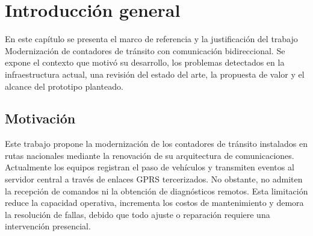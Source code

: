 
\chapter{Introducción general} %

\label{Chapter1} %
\label{IntroGeneral}


\newcommand{\keyword}[1]{\textbf{#1}}
\newcommand{\tabhead}[1]{\textbf{#1}}
\newcommand{\code}[1]{\texttt{#1}}
\newcommand{\file}[1]{\texttt{\bfseries#1}}
\newcommand{\option}[1]{\texttt{\itshape#1}}
\newcommand{\grados}{$^{\circ}$}

En este capítulo se presenta el marco de referencia y la justificación del trabajo Modernización de contadores de tránsito con comunicación bidireccional. Se expone el contexto que motivó su desarrollo, los problemas detectados en la infraestructura actual, una revisión del estado del arte, la propuesta de valor y el alcance del prototipo planteado.





\section{Motivación}

Este trabajo propone la modernización de los contadores de tránsito instalados en rutas nacionales mediante la renovación de su arquitectura de comunicaciones. Actualmente los equipos registran el paso de vehículos y transmiten eventos al servidor central a través de enlaces GPRS tercerizados. No obstante, no admiten la recepción de comandos ni la obtención de diagnósticos remotos. Esta limitación reduce la capacidad operativa, incrementa los costos de mantenimiento y demora la resolución de fallas, debido que todo ajuste o reparación requiere una intervención presencial.

